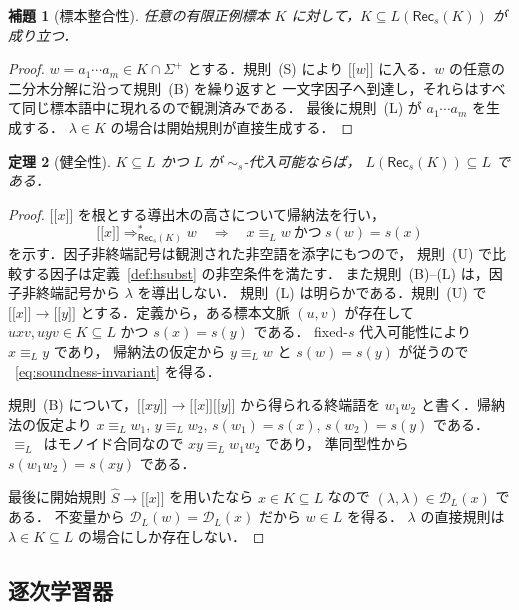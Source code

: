 \documentclass[11pt,a4paper]{ltjsarticle}
\newcommand{\NT}[1]{\mathopen{[\![}#1\mathclose{]\!]}}
\newtheorem{theorem}{定理}[section]
\newtheorem{lemma}[theorem]{補題}
\theoremstyle{remark}
\theoremstyle{plain}
\newcommand{\D}{\mathcal{D}}
\begin{document}
\begin{lemma}[標本整合性]\label{lem:sample-consistency}
任意の有限正例標本 $K$ に対して，$K\subseteq L(\mathsf{Rec}_s(K))$ が成り立つ．
\end{lemma}
\begin{proof}
$w=a_1\cdots a_m\in K\cap\Sigma^+$ とする．規則~\textup{(S)} により
$\NT{w}$ に入る．$w$ の任意の二分木分解に沿って規則~\textup{(B)} を繰り返すと
一文字因子へ到達し，それらはすべて同じ標本語中に現れるので観測済みである．
最後に規則~\textup{(L)} が $a_1\cdots a_m$ を生成する．
$\lambda\in K$ の場合は開始規則が直接生成する．
\end{proof}

\begin{theorem}[健全性]\label{thm:soundness}
$K\subseteq L$ かつ $L$ が $\sim_s$-代入可能ならば，
$L(\mathsf{Rec}_s(K))\subseteq L$ である．
\end{theorem}

\begin{proof}
$\NT{x}$ を根とする導出木の高さについて帰納法を行い，
\begin{equation}\label{eq:soundness-invariant}
 \NT{x}\Rightarrow_{\mathsf{Rec}_s(K)}^*w
 \quad\Longrightarrow\quad
 x\equiv_L w\ \text{かつ}\ s(w)=s(x)
\end{equation}
を示す．因子非終端記号は観測された非空語を添字にもつので，
規則~\textup{(U)} で比較する因子は定義~\ref{def:hsubst} の非空条件を満たす．
また規則~\textup{(B)}--\textup{(L)} は，因子非終端記号から
$\lambda$ を導出しない．
規則~\textup{(L)} は明らかである．規則~\textup{(U)} で
$\NT{x}\to\NT{y}$ とする．定義から，ある標本文脈 $(u,v)$ が存在して
$uxv,uyv\in K\subseteq L$ かつ $s(x)=s(y)$ である．
fixed-$s$ 代入可能性により $x\equiv_L y$ であり，
帰納法の仮定から $y\equiv_L w$ と $s(w)=s(y)$ が従うので
~\eqref{eq:soundness-invariant} を得る．

規則~\textup{(B)} について，$\NT{xy}\to\NT{x}\NT{y}$ から得られる終端語を
$w_1w_2$ と書く．帰納法の仮定より
$x\equiv_L w_1$, $y\equiv_L w_2$,
$s(w_1)=s(x)$, $s(w_2)=s(y)$ である．
$\,\equiv_L\,$ はモノイド合同なので $xy\equiv_L w_1w_2$ であり，
準同型性から $s(w_1w_2)=s(xy)$ である．

最後に開始規則 $\widehat S\to\NT{x}$ を用いたなら
$x\in K\subseteq L$ なので $(\lambda,\lambda)\in\D_L(x)$ である．
不変量から $\D_L(w)=\D_L(x)$ だから $w\in L$ を得る．
$\lambda$ の直接規則は $\lambda\in K\subseteq L$ の場合にしか存在しない．
\end{proof}

\subsection{逐次学習器}
\end{document}
